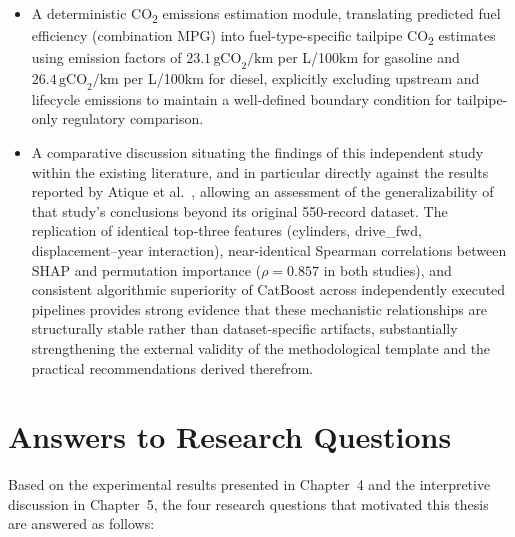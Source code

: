 \begin{itemize}
    \item A deterministic CO\textsubscript{2} emissions estimation module, translating predicted fuel efficiency (combination MPG) into fuel-type-specific tailpipe CO\textsubscript{2} estimates using emission factors of \(23.1\,\text{gCO}_2/\text{km}\) per L/100km for gasoline and \(26.4\,\text{gCO}_2/\text{km}\) per L/100km for diesel, explicitly excluding upstream and lifecycle emissions to maintain a well-defined boundary condition for tailpipe-only regulatory comparison.

    \item A comparative discussion situating the findings of this independent study within the existing literature, and in particular directly against the results reported by Atique et al.~\cite{atique2026explainable}, allowing an assessment of the generalizability of that study's conclusions beyond its original 550-record dataset. The replication of identical top-three features (cylinders, drive\_fwd, displacement--year interaction), near-identical Spearman correlations between SHAP and permutation importance (\(\rho = 0.857\) in both studies), and consistent algorithmic superiority of CatBoost across independently executed pipelines provides strong evidence that these mechanistic relationships are structurally stable rather than dataset-specific artifacts, substantially strengthening the external validity of the methodological template and the practical recommendations derived therefrom.
\end{itemize}


\section{Answers to Research Questions}

Based on the experimental results presented in Chapter~4 and the interpretive discussion in Chapter~5, the four research questions that motivated this thesis are answered as follows:

